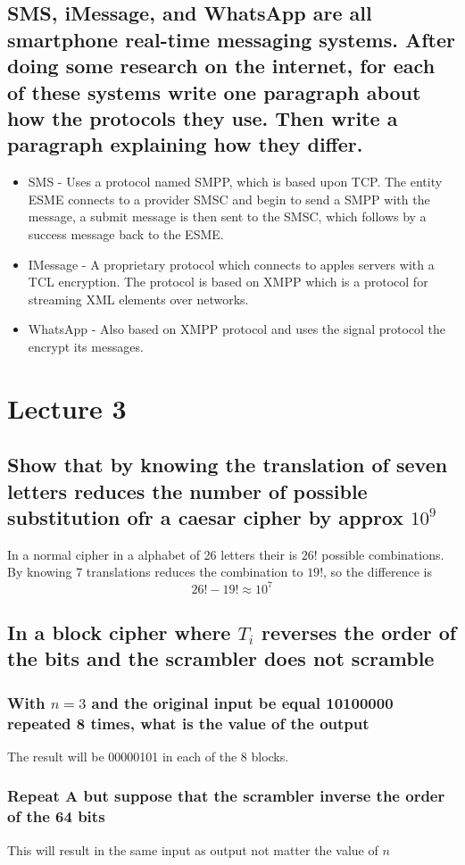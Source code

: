 \documentclass[12pt, a4paper]{article}
\begin{document}
		\subsection{SMS, iMessage, and WhatsApp are all smartphone real-time messaging systems. After doing some research on the internet, for each of these systems write one paragraph about how the protocols they use. Then write a paragraph explaining how they differ.}
			\begin{itemize}
				\item SMS - Uses a protocol named SMPP, which is based upon TCP. The entity ESME connects to a provider SMSC and begin to send a SMPP with the message, a submit message is then sent to the SMSC, which follows by a success message back to the ESME.
				\item IMessage - A proprietary protocol which connects to apples servers with a TCL encryption. The protocol is based on XMPP which is a protocol for streaming XML elements over networks.
				\item WhatsApp - Also based on XMPP protocol and uses the signal protocol the encrypt its messages.
			\end{itemize} 
	\section{Lecture 3}
		\subsection{Show that by knowing the translation of seven letters reduces the number of possible substitution ofr a caesar cipher by approx $10^9$}
			In a normal cipher in a alphabet of 26 letters their is $26!$ possible combinations.\\
			By knowing 7 translations reduces the combination to $19!$, so the difference is
			$$26!-19!\approx 10^7$$
		\subsection{In a block cipher where $T_i$ reverses the order of the bits and the scrambler does not scramble}
			\subsubsection{With $n=3$ and the original input be equal 10100000 repeated 8 times, what is the value of the output}
				The result will be 00000101 in each of the 8 blocks.
			\subsubsection{Repeat A but suppose that the scrambler inverse the order of the 64 bits}
				This will result in the same input as output not matter the value of $n$
\end{document}
